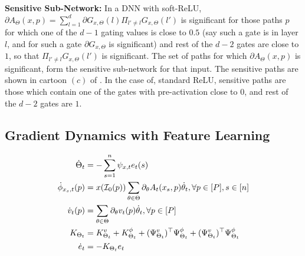 \textbf{Sensitive Sub-Network:} In a DNN with soft-ReLU, $\partial A_{\Theta}(x,p)=\sum_{l=1}^d \partial G_{x,\Theta}(l)\Pi_{l'\neq l}G_{x,\Theta}(l')$ is significant for those paths $p$ for which one of the $d-1$ gating values is close to $0.5$ (say such a gate is in layer $l$, and for such a gate $\partial G_{x,\Theta}$ is significant) and rest of the $d-2$ gates are close to $1$, so that $\Pi_{l'\neq l}G_{x,\Theta}(l')$ is significant. The set of paths for which $\partial A_{\Theta}(x,p)$ is significant, form the sensitive sub-network for that input. The sensitive paths are shown in cartoon $(c)$ of . In the case of, standard ReLU, sensitive paths are those which contain one of the gates with pre-activation close to $0$, and rest of the $d-2$ gates are $1$.
\subsection{Gradient Dynamics with Feature Learning}
\begin{align}
\dot{\Theta}_t&=-\sum_{s=1}^n \psi_{x,t}e_t(s)\\
\dot{\phi}_{x_s,t}(p)&=x(\mathcal{I}_0(p))\sum_{\theta\in\Theta}\partial_{\theta}A_t(x_s,p)\dot{\theta}_t,\forall p\in[P], s\in[n]\\
\dot{v}_t(p)&=\sum_{\theta\in\Theta}\partial_{\theta}v_t(p)\dot{\theta}_t,\forall p\in[P]\\
K_{\Theta_t}&=K^v_{\Theta_t}+K^{\phi}_{\Theta_t}+(\Psi^v_{\Theta_t})^\top \Psi^{\phi}_{\Theta_t}+(\Psi^v_{\Theta_t})^\top\Psi^{\phi}_{\Theta_t}\\
\dot{e}_t&=-K_{\Theta_t}e_t
\end{align}
